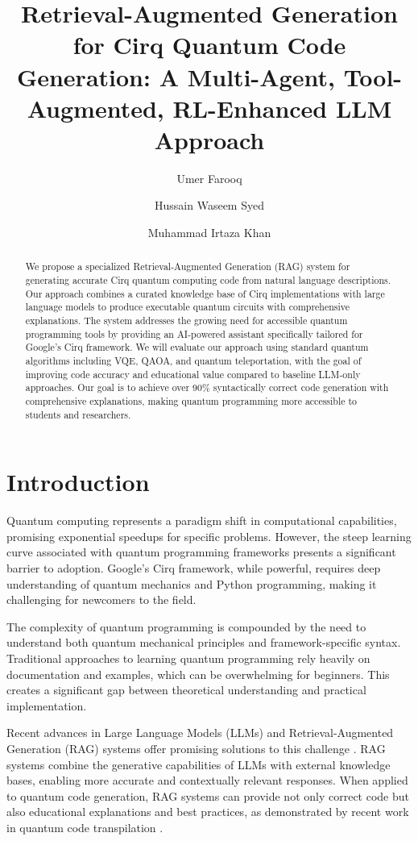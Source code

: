 \documentclass[runningheads]{llncs}
\title{Retrieval-Augmented Generation for Cirq Quantum Code Generation: A Multi-Agent, Tool-Augmented, RL-Enhanced LLM Approach}
\author{Umer Farooq \and Hussain Waseem Syed \and Muhammad Irtaza Khan}
\institute{FAST NUCES Islamabad, Department of Computer Science\\
\email{i220891@nu.edu.pk, i220893@nu.edu.pk, i220911@nu.edu.pk}}
\begin{document}
\maketitle

\begin{abstract}
We propose a specialized Retrieval-Augmented Generation (RAG) system for generating accurate Cirq quantum computing code from natural language descriptions. Our approach combines a curated knowledge base of Cirq implementations with large language models to produce executable quantum circuits with comprehensive explanations. The system addresses the growing need for accessible quantum programming tools by providing an AI-powered assistant specifically tailored for Google's Cirq framework. We will evaluate our approach using standard quantum algorithms including VQE, QAOA, and quantum teleportation, with the goal of improving code accuracy and educational value compared to baseline LLM-only approaches. Our goal is to achieve over 90\% syntactically correct code generation with comprehensive explanations, making quantum programming more accessible to students and researchers.
\end{abstract}

\section{Introduction}

Quantum computing represents a paradigm shift in computational capabilities, promising exponential speedups for specific problems. However, the steep learning curve associated with quantum programming frameworks presents a significant barrier to adoption. Google's Cirq framework, while powerful, requires deep understanding of quantum mechanics and Python programming, making it challenging for newcomers to the field.

The complexity of quantum programming is compounded by the need to understand both quantum mechanical principles and framework-specific syntax. Traditional approaches to learning quantum programming rely heavily on documentation and examples, which can be overwhelming for beginners. This creates a significant gap between theoretical understanding and practical implementation.

Recent advances in Large Language Models (LLMs) and Retrieval-Augmented Generation (RAG) systems offer promising solutions to this challenge \cite{siavash2025modeldrivenquantumcodegeneration}. RAG systems combine the generative capabilities of LLMs with external knowledge bases, enabling more accurate and contextually relevant responses. When applied to quantum code generation, RAG systems can provide not only correct code but also educational explanations and best practices, as demonstrated by recent work in quantum code transpilation \cite{siavash2025llmpoweredquantumcodetranspilation}.
\end{document}
